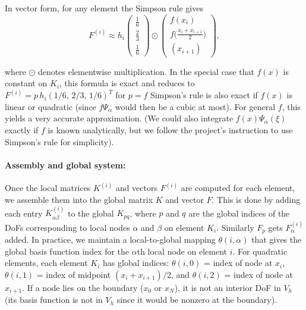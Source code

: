 \documentclass[a4paper,10pt]{article}
\begin{document}
In vector form, for any element the Simpson rule gives
\[F^{(i)} \approx h_i \begin{pmatrix} 	\frac{1}{6} \\[1ex]\frac{2}{3}\\[1ex] 	\frac{1}{6} \end{pmatrix} \odot \begin{pmatrix} 	f(x_i)                             \\[1ex] 	f\!\big(\frac{x_i+x_{i+1}}{2}\big) \\[1ex] 	(x_{i+1}) \end{pmatrix},\]

where \(\odot\) denotes elementwise multiplication.
In the special case that \(f(x)\) is constant on \(K_i\), this formula is exact and reduces to \(F^{(i)} = p\,h_i(1/6,\,2/3,\,1/6)^T\) for \(p=f\)
Simpson's rule is also exact if \(f(x)\) is linear or quadratic (since \(f\Psi_\alpha\) would then be a cubic at most). For general \(f\), this yields a very accurate approximation. (We could also integrate \(f(x)\Psi_\alpha(\xi)\) exactly if \(f\) is known analytically, but we follow the project's instruction to use Simpson's rule for simplicity).

\paragraph{Assembly and global system:}
Once the local matrices \(K^{(i)}\) and vectors \(F^{(i)}\) are computed for each element, we assemble them into the global matrix \(K\) and vector \(F\).
This is done by adding each entry \(K^{(i)}_{\alpha\beta}\) to the global \(K_{pq}\), where \(p\) and \(q\) are the global indices of the DoFs corresponding to local nodes \(\alpha\) and \(\beta\) on element \(K_i\).
Similarly \(F_p\) gets \(F^{(i)}_\alpha\) added. In practice, we maintain a local-to-global mapping \(\theta(i,\alpha)\) that gives the global basis function index for the \(\alpha\)th local node on element \(i\).
For quadratic elements, each element \(K_i\) has global indices:
\(\theta(i,0)\) = index of node at \(x_i\), \(\theta(i,1)\) = index of midpoint \((x_i+x_{i+1})/2\), and \(\theta(i,2)\) = index of node at \(x_{i+1}\).
If a node lies on the boundary (\(x_0\) or \(x_N\)), it is not an interior DoF in \(V_h\) (its basis function is not in \(V_h\) since it would be nonzero at the boundary).
\end{document}
